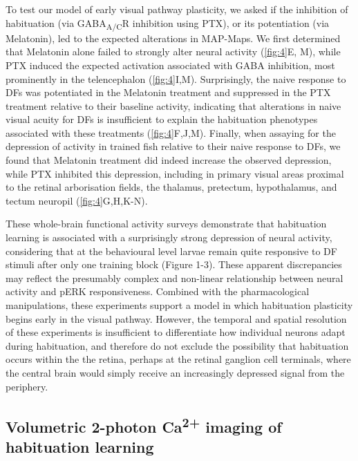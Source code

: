 \documentclass[9pt,lineno]{RandlettLab_elife}
\begin{document}
To test our model of early visual pathway plasticity, we asked if the inhibition of habituation (via GABA\textsubscript{A/C}R inhibition using PTX), or its potentiation (via Melatonin), led to the expected alterations in MAP-Maps. We first determined that Melatonin alone failed to strongly alter neural activity (\autoref{fig:4}E, M), while PTX induced the expected activation associated with GABA inhibition, most prominently in the telencephalon (\autoref{fig:4}I,M). Surprisingly, the naive response to DFs was potentiated in the Melatonin treatment and suppressed in the PTX treatment relative to their baseline activity, indicating that alterations in naive visual acuity for DFs is insufficient to explain the habituation phenotypes associated with these treatments (\autoref{fig:4}F,J,M). Finally, when assaying for the depression of activity in trained fish relative to their naive response to DFs, we found that Melatonin treatment did indeed increase the observed depression, while PTX inhibited this depression, including in primary visual areas proximal to the retinal arborisation fields, the thalamus, pretectum, hypothalamus, and tectum neuropil (\autoref{fig:4}G,H,K-N). 

These whole-brain functional activity surveys demonstrate that habituation learning is associated with a surprisingly strong depression of neural activity, considering that at the behavioural level larvae remain quite responsive to DF stimuli after only one training block (Figure 1-3). These apparent discrepancies may reflect the presumably complex and non-linear relationship between neural activity and pERK responsiveness. Combined with the pharmacological manipulations, these experiments support a model in which habituation plasticity begins early in the visual pathway. However, the temporal and spatial resolution of these experiments is insufficient to differentiate how individual neurons adapt during habituation, and therefore do not exclude the possibility that habituation occurs within the the retina, perhaps at the retinal ganglion cell terminals, where the central brain would simply receive an increasingly depressed signal from the periphery. 

\subsection{Volumetric 2-photon Ca\textsuperscript{2+} imaging of habituation learning}
\end{document}
